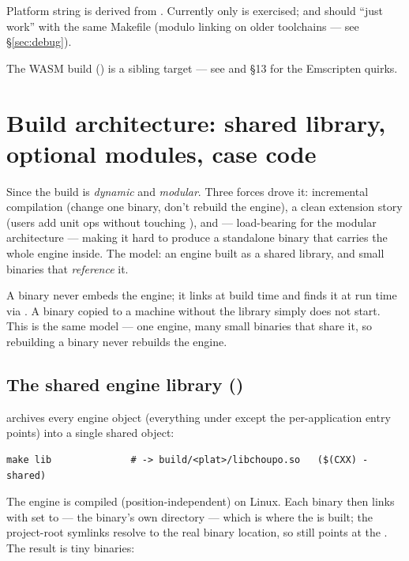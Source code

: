 \documentclass[11pt,a4paper]{article}
\begin{document}
Platform string is derived from . Currently only
 is exercised;  and
 should ``just work'' with the same Makefile (modulo
 linking on older toolchains --- see
\S\ref{sec:debug}).

The WASM build () is a sibling target --- see
 and  \S13 for the Emscripten quirks.

\section{Build architecture: shared library, optional modules, case code}
\label{sec:build-arch}

Since the build is \emph{dynamic} and \emph{modular}.  Three forces
drove it: incremental compilation (change one binary, don't rebuild the
engine), a clean extension story (users add unit ops without touching
), and --- load-bearing for the modular architecture ---
making it hard to produce a standalone binary that carries the whole
engine inside.  The model: an engine built as a shared
library, and small binaries that \emph{reference} it.

\begin{keyidea}
A binary never embeds the engine; it links  at
build time and finds it at run time via .  A binary copied to
a machine without the library simply does not start.  This is the
same model --- one engine, many small binaries that share it, so
rebuilding a binary never rebuilds the engine.
\end{keyidea}

\subsection{The shared engine library ()}

 archives every engine object (everything under
 except the per-application entry points) into a single shared
object:

\begin{lstlisting}
make lib              # -> build/<plat>/libchoupo.so   ($(CXX) -shared)
\end{lstlisting}

The engine is compiled  (position-independent) on Linux.  Each
binary then links  with  set to
 --- the binary's own directory --- which is where the
 is built; the project-root symlinks resolve to the real binary
location, so  still points at the .  The result
is tiny binaries:
\end{document}
